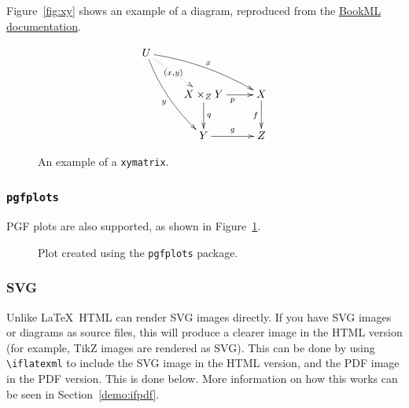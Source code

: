 Figure~\ref{fig:xy} shows an example of a diagram, reproduced from the \href{https://vlmantova.github.io/bookml/#S4.F4}{BookML documentation}.


\begin{figure}
    \begin{bmlimage}
    $$
      \xymatrix{
        U \ar@/_/[ddr]_y \ar@/^/[drr]^x \ar@{.>}[dr]|-{(x,y)} \\
        & X \times_Z Y \ar[d]^q \ar[r]_p & X \ar[d]_f \\
        & Y \ar[r]^g & Z}
    $$
    \end{bmlimage}
    \caption{An example of a \texttt{xymatrix}.}
\end{figure}


\subsubsection{\texttt{pgfplots}}
\label{demo:fig:pgf}

PGF plots are also supported, as shown in Figure~\ref{fig:sqrt}.

\begin{figure}[H]
    \centering
    \caption{Plot created using the \texttt{pgfplots} package.}
    \label{fig:sqrt}
\end{figure}

\subsubsection{SVG}
\label{demo:fig:svg}

Unlike \LaTeX\, HTML can render SVG images directly. If you have SVG images or diagrams as source files, this will produce a clearer image in the HTML version (for example, TikZ images are rendered as SVG). This can be done by using \verb|\iflatexml| to include the SVG image in the HTML version, and the PDF image in the PDF version. This is done below. More information on how this works can be seen in Section~\ref{demo:ifpdf}.

